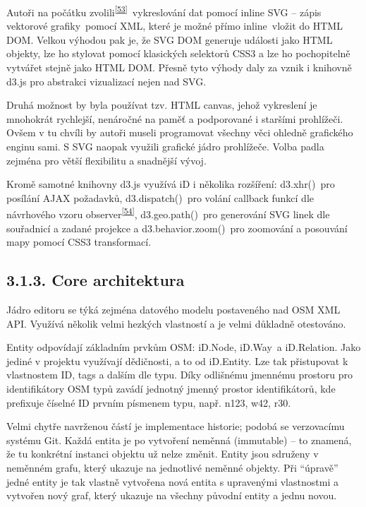 Autoři na počátku zvolili\textsuperscript{\href{}{{[}53{]}}}~vykreslování dat pomocí inline SVG -- zápis vektorové grafiky~pomocí XML, které je možné přímo inline~vložit do HTML DOM. Velkou výhodou pak je, že SVG DOM generuje události jako HTML objekty, lze ho stylovat pomocí klasických selektorů CSS3 a lze ho pochopitelně vytvářet stejně jako HTML DOM. Přesně tyto výhody daly za vznik i knihovně d3.js pro abstrakci vizualizací nejen nad SVG.

Druhá možnost by byla používat tzv. HTML canvas, jehož vykreslení je mnohokrát rychlejší, nenáročné na paměť a podporované i staršími prohlížeči. Ovšem v tu chvíli by autoři museli programovat všechny věci ohledně grafického enginu sami. S SVG naopak využili grafické jádro prohlížeče. Volba padla zejména pro větší flexibilitu a snadnější vývoj.

Kromě samotné knihovny d3.js využívá iD i několika rozšíření: d3.xhr()~pro posílání AJAX požadavků, d3.dispatch()~pro volání callback funkcí dle návrhového vzoru observer\textsuperscript{\href{}{{[}54{]}}}, d3.geo.path()~pro generování SVG linek dle souřadnicí a zadané projekce a d3.behavior.zoom()~pro zoomování a posouvání mapy pomocí CSS3 transformací.

\subsection{3.1.3. Core architektura}\label{core-architektura-1}

Jádro editoru se týká zejména datového modelu postaveného nad OSM XML API. Využívá několik velmi hezkých vlastností a je velmi důkladně otestováno.

Entity odpovídají základním prvkům OSM: iD.Node, iD.Way~a iD.Relation. Jako jediné v projektu využívají dědičnosti, a to od iD.Entity. Lze tak přistupovat k vlastnostem ID, tags a dalším dle typu. Díky odlišnému jmennému prostoru pro identifikátory OSM typů zavádí jednotný jmenný prostor identifikátorů, kde prefixuje číselné ID prvním písmenem typu, např. n123, w42, r30.

Velmi chytře navrženou částí je implementace historie; podobá se verzovacímu systému Git. Každá entita je po vytvoření neměnná (immutable) -- to znamená, že tu konkrétní instanci objektu už nelze změnit. Entity jsou sdruženy v neměnném grafu, který ukazuje na jednotlivé neměnné objekty. Při ``úpravě'' jedné entity je tak vlastně vytvořena nová entita s upravenými vlastnostmi a vytvořen nový graf, který ukazuje na všechny původní entity a jednu novou.

